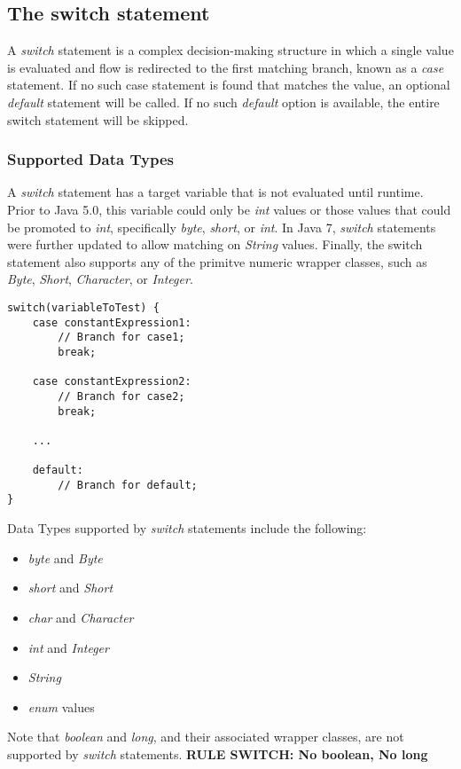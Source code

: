 \documentclass{article}
\begin{document}
\subsection{The switch statement}
A \emph{switch} statement is a complex decision-making structure in which a single value is evaluated and flow is redirected to the first matching branch, known as a \emph{case} statement. If no such case statement is found that matches the value, an optional \emph{default} statement will be called. If no such \emph{default} option is available, the entire switch statement will be skipped.
\subsubsection{Supported Data Types}
A \emph{switch} statement has a target variable that is not evaluated until runtime. Prior to Java 5.0, this variable could only be 
\emph{int} values or those values that could be promoted to \emph{int}, specifically \emph{byte}, \emph{short}, or \emph{int}. In Java 7, \emph{switch} statements were further updated to allow matching on \emph{String} values. Finally, the switch statement also supports any of the primitve numeric wrapper classes, such as \emph{Byte}, \emph{Short}, \emph{Character}, or \emph{Integer}.

\begin{lstlisting}
switch(variableToTest) {
	case constantExpression1:
		// Branch for case1;
		break;

	case constantExpression2:
		// Branch for case2;
		break;

	...

	default:
		// Branch for default;
}
\end{lstlisting}

Data Types supported by \emph{switch} statements include the following:
\begin{itemize}
	\item \emph{byte} and \emph{Byte}
	\item \emph{short} and \emph{Short}
	\item \emph{char} and \emph{Character}
	\item \emph{int} and \emph{Integer}
	\item \emph{String}
	\item \emph{enum} values
\end{itemize}
Note that \emph{boolean} and \emph{long}, and their associated wrapper classes, are not supported by \emph{switch} statements.
\textbf{RULE SWITCH: No boolean, No long}
\end{document}
